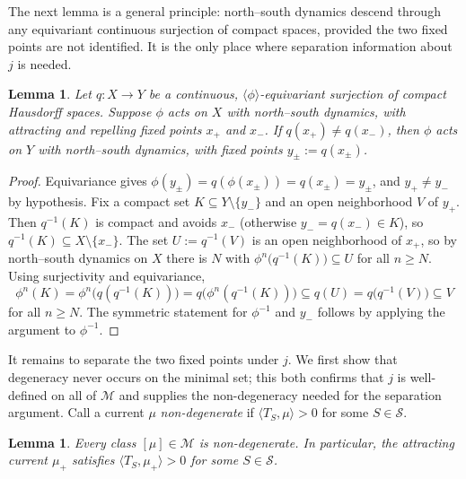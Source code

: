 \documentclass[12pt,a4paper]{amsart}
\numberwithin{equation}{section}
\theoremstyle{plain}
\newtheorem{lemma}[theorem]{Lemma}
\theoremstyle{definition}
\theoremstyle{remark}
\begin{document}
The next lemma is a general principle: north–south dynamics descend through any equivariant continuous surjection of compact spaces, provided the two fixed points are not identified.
It is the only place where separation information about $j$ is needed.

\begin{lemma}\label{lem:descent}
    Let $q \colon X \to Y$ be a continuous, $\langle\phi\rangle$-equivariant surjection of compact Hausdorff spaces.
    Suppose $\phi$ acts on $X$ with north–south dynamics, with attracting and repelling fixed points $x_+$ and $x_-$.
    If $q(x_+) \neq q(x_-)$, then $\phi$ acts on $Y$ with north–south dynamics, with fixed points $y_\pm := q(x_\pm)$.
\end{lemma}

\begin{proof}
    Equivariance gives $\phi(y_\pm) = q(\phi(x_\pm)) = q(x_\pm) = y_\pm$, and $y_+ \neq y_-$ by hypothesis.
    Fix a compact set $K \subseteq Y \setminus \{y_-\}$ and an open neighborhood $V$ of $y_+$.
    Then $q^{-1}(K)$ is compact and avoids $x_-$ (otherwise $y_- = q(x_-) \in K$), so $q^{-1}(K) \subseteq X \setminus \{x_-\}$.
    The set $U := q^{-1}(V)$ is an open neighborhood of $x_+$, so by north–south dynamics on $X$ there is $N$ with $\phi^n\big(q^{-1}(K)\big) \subseteq U$ for all $n \geq N$.
    Using surjectivity and equivariance,
    \[
        \phi^n(K) = \phi^n\big(q(q^{-1}(K))\big) = q\big(\phi^n(q^{-1}(K))\big) \subseteq q(U) = q\big(q^{-1}(V)\big) \subseteq V
    \]
    for all $n \geq N$.
    The symmetric statement for $\phi^{-1}$ and $y_-$ follows by applying the argument to $\phi^{-1}$.
\end{proof}

It remains to separate the two fixed points under $j$.
We first show that degeneracy never occurs on the minimal set; this both confirms that $j$ is well-defined on all of $\mathcal{M}$ and supplies the non-degeneracy needed for the separation argument.
Call a current $\mu$ \emph{non-degenerate} if $\langle T_S, \mu\rangle > 0$ for some $S \in \mathcal{S}$.

\begin{lemma}\label{lem:nondegeneracy}
    Every class $[\mu] \in \mathcal{M}$ is non-degenerate.
    In particular, the attracting current $\mu_+$ satisfies $\langle T_S, \mu_+\rangle > 0$ for some $S \in \mathcal{S}$.
\end{lemma}
\end{document}
